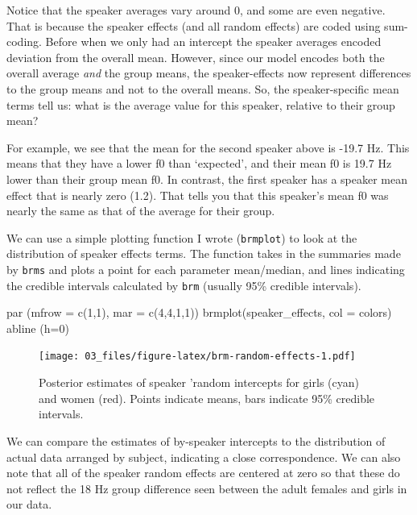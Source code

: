 \documentclass[
]{book}
\newenvironment{Shaded}{\begin{snugshade}}{\end{snugshade}}
\newcommand{\AttributeTok}[1]{\textcolor[rgb]{0.77,0.63,0.00}{#1}}
\newcommand{\DecValTok}[1]{\textcolor[rgb]{0.00,0.00,0.81}{#1}}
\newcommand{\FunctionTok}[1]{\textcolor[rgb]{0.00,0.00,0.00}{#1}}
\newcommand{\NormalTok}[1]{#1}
\begin{document}
Notice that the speaker averages vary around 0, and some are even negative. That is because the speaker effects (and all random effects) are coded using sum-coding. Before when we only had an intercept the speaker averages encoded deviation from the overall mean. However, since our model encodes both the overall average \emph{and} the group means, the speaker-effects now represent differences to the group means and not to the overall means. So, the speaker-specific mean terms tell us: what is the average value for this speaker, relative to their group mean?

For example, we see that the mean for the second speaker above is -19.7 Hz. This means that they have a lower f0 than `expected', and their mean f0 is 19.7 Hz lower than their group mean f0. In contrast, the first speaker has a speaker mean effect that is nearly zero (1.2). That tells you that this speaker's mean f0 was nearly the same as that of the average for their group.

We can use a simple plotting function I wrote (\texttt{brmplot}) to look at the distribution of speaker effects terms. The function takes in the summaries made by \texttt{brms} and plots a point for each parameter mean/median, and lines indicating the credible intervals calculated by \texttt{brm} (usually 95\% credible intervals).

\begin{Shaded}
\begin{Highlighting}[]
\FunctionTok{par}\NormalTok{ (}\AttributeTok{mfrow =} \FunctionTok{c}\NormalTok{(}\DecValTok{1}\NormalTok{,}\DecValTok{1}\NormalTok{), }\AttributeTok{mar =} \FunctionTok{c}\NormalTok{(}\DecValTok{4}\NormalTok{,}\DecValTok{4}\NormalTok{,}\DecValTok{1}\NormalTok{,}\DecValTok{1}\NormalTok{))}
\FunctionTok{brmplot}\NormalTok{(speaker\_effects, }\AttributeTok{col =}\NormalTok{ colors)}
\FunctionTok{abline}\NormalTok{ (}\AttributeTok{h=}\DecValTok{0}\NormalTok{)}
\end{Highlighting}
\end{Shaded}

\begin{figure}
\centering
\texttt{[image: 03\_files/figure-latex/brm-random-effects-1.pdf]}
\caption{\label{fig:brm-random-effects}Posterior estimates of speaker 'random intercepts for girls (cyan) and women (red). Points indicate means, bars indicate 95\% credible intervals.}
\end{figure}

We can compare the estimates of by-speaker intercepts to the distribution of actual data arranged by subject, indicating a close correspondence. We can also note that all of the speaker random effects are centered at zero so that these do not reflect the 18 Hz group difference seen between the adult females and girls in our data.
\end{document}

